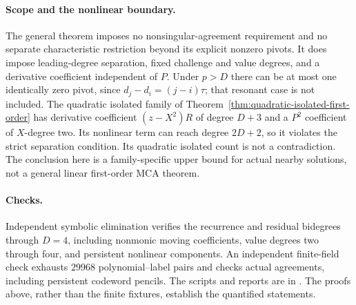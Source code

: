 \paragraph{Scope and the nonlinear boundary.}
The general theorem imposes no nonsingular-agreement requirement and no
separate characteristic restriction beyond its explicit nonzero pivots.
It does impose leading-degree separation, fixed challenge and value
degrees, and a derivative coefficient independent of $P$. Under $p>D$
there can be at most one identically zero pivot, since
$d_j-d_i=(j-i)\tau$; that resonant case is not included.
The quadratic isolated family of
Theorem~\ref{thm:quadratic-isolated-first-order} has derivative coefficient
$(z-X^2)R$ of degree $D+3$ and a $P^2$ coefficient of $X$-degree two.
Its nonlinear term can reach degree $2D+2$, so it violates the strict
separation condition. Its quadratic isolated count is not a contradiction.
The conclusion here is a family-specific upper bound for actual nearby
solutions, not a general linear first-order MCA theorem.

\paragraph{Checks.}
Independent symbolic elimination verifies the recurrence and residual
bidegrees through $D=4$, including nonmonic moving coefficients, value
degrees two through four, and persistent nonlinear components. An
independent finite-field check exhausts $29968$ polynomial--label pairs
and checks actual agreements, including persistent codeword pencils.
The scripts and reports are in .
The proofs above, rather than the finite fixtures, establish the
quantified statements.
